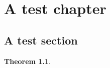 \documentclass[twoside]{book}
\theoremstyle{mystyle}
\newtheorem{theo}{Theorem}
\begin{document}
\chapter{A test chapter}
\section{A test section}
\begin{theo}
\lipsum[1]
\end{theo}
\lipsum[1-30]
\end{document}
